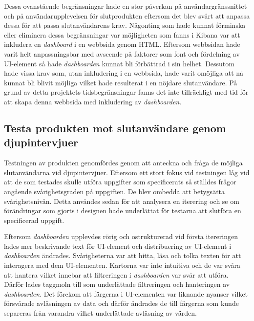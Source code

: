 \documentclass[12pt]{kththesis}
\begin{document}
Dessa ovanstående begränsningar hade en stor påverkan på användargränssnittet och på användarupplevelsen för slutprodukten eftersom det blev svårt att anpassa dessa för att passa slutanvändarens krav. Någonting som hade kunnat förminska eller eliminera dessa begränsningar var möjligheten som fanns i Kibana var att inkludera en \textit{dashboard} i en webbsida genom HTML. Eftersom webbsidan hade varit helt anpassningsbar med avseende på faktorer som font och fördelning av UI-element så hade \textit{dashboarden} kunnat bli förbättrad i sin helhet. Dessutom hade vissa krav som, utan inkludering i en webbsida, hade varit omöjliga att nå kunnat bli blivit möjliga vilket hade resulterat i en nöjdare slutanvändare. På grund av detta projektets tidsbegränsningar fanns det inte tillräckligt med tid för att skapa denna webbsida med inkludering av \textit{dashboarden}.  

\subsection{Testa produkten mot slutanvändare genom djupintervjuer } 
Testningen av produkten genomfördes genom att anteckna och fråga de möjliga slutanvändarna vid djupintervjuer. Eftersom ett stort fokus vid testningen låg vid att de som testades skulle utföra uppgifter som specificerats så ställdes frågor angående svårighetsgraden på uppgiften. De blev ombedda att betygsätta svårighetsnivån. Detta användes sedan för att analysera en iterering och se om förändringar som gjorts i designen hade underlättat för testarna att slutföra en specificerad uppgift. 

Eftersom \textit{dashboarden} upplevdes rörig och ostrukturerad vid första itereringen lades mer beskrivande text för UI-element och distribuering av UI-element i \textit{dashboarden} ändrades. Svårigheterna var att hitta, läsa och tolka texten för att interagera med dem UI-elementen. Kartorna var inte intuitiva och de var svåra att hantera vilket innebar att filtreringen i \textit{dashboarden} var svår att utföra. Därför lades taggmoln till som underlättade filtreringen och hanteringen av \textit{dashboarden}. Det förekom att färgerna i UI-elementen var liknande nyanser vilket försvårade avläsningen av data och därför ändrades de till färgerna som kunde separeras från varandra vilket underlättade avläsning av värden.
\end{document}
